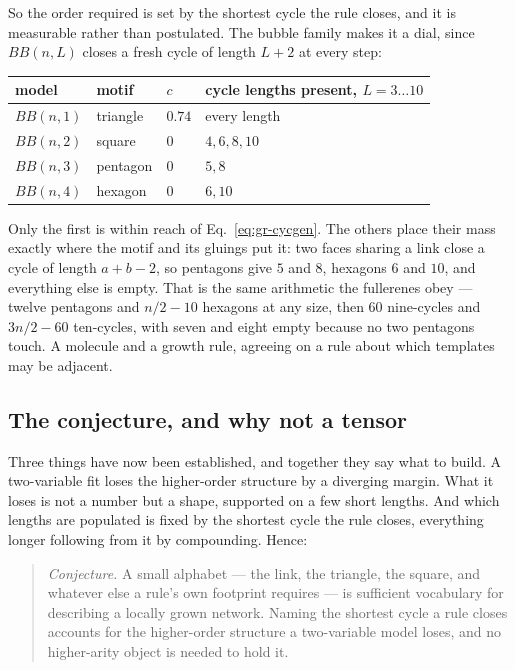 So the order required is set by the shortest cycle the rule closes, and it is
measurable rather than postulated. The bubble family makes it a dial, since
$BB(n,L)$ closes a fresh cycle of length $L+2$ at every step:

\begin{center}
\begin{tabular}{llll}
\hline
model & motif & $c$ & cycle lengths present, $L=3\ldots10$\\
\hline
$BB(n,1)$ & triangle & $0.74$ & every length\\
$BB(n,2)$ & square & $0$ & $4,6,8,10$\\
$BB(n,3)$ & pentagon & $0$ & $5,8$\\
$BB(n,4)$ & hexagon & $0$ & $6,10$\\
\hline
\end{tabular}
\end{center}

\noindent Only the first is within reach of Eq.~\eqref{eq:gr-cycgen}. The others
place their mass exactly where the motif and its gluings put it: two faces
sharing a link close a cycle of length $a+b-2$, so pentagons give $5$ and $8$,
hexagons $6$ and $10$, and everything else is empty. That is the same arithmetic
the fullerenes obey --- twelve pentagons and $n/2-10$ hexagons at any size, then
$60$ nine-cycles and $3n/2-60$ ten-cycles, with seven and eight empty because no
two pentagons touch. A molecule and a growth rule, agreeing on a rule about which
templates may be adjacent.

\subsection*{The conjecture, and why not a tensor}

Three things have now been established, and together they say what to build. A
two-variable fit loses the higher-order structure by a diverging margin. What it
loses is not a number but a shape, supported on a few short lengths. And which
lengths are populated is fixed by the shortest cycle the rule closes, everything
longer following from it by compounding. Hence:

\begin{quote}
\emph{Conjecture.} A small alphabet --- the link, the triangle, the square, and
whatever else a rule's own footprint requires --- is sufficient vocabulary for
describing a locally grown network. Naming the shortest cycle a rule closes
accounts for the higher-order structure a two-variable model loses, and no
higher-arity object is needed to hold it.
\end{quote}

